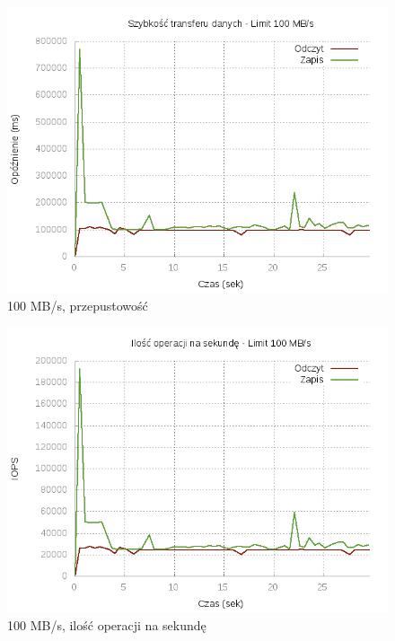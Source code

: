 \begin{figure}[h]
	\centering
	\includegraphics[scale=0.9]{results/100_bw.png}
		\caption{100 MB/s, przepustowość}
    \label{fig:100-bw}
\end{figure}
\begin{figure}[h]
	\centering
	\includegraphics[scale=0.9]{results/100_iops.png}
		\caption{100 MB/s, ilość operacji na sekundę}
    \label{fig:100-iops}
\end{figure}
